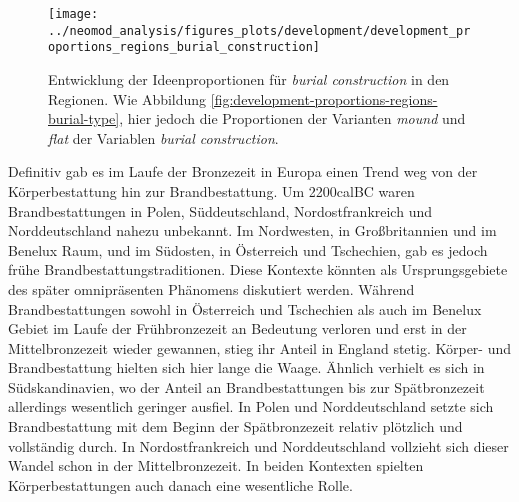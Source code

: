 \documentclass[openany,twoside,twocolumn]{book}
\begin{document}
\begin{figure}[!t]

{\centering \texttt{[image: ../neomod\_analysis/figures\_plots/development/development\_proportions\_regions\_burial\_construction]} 

}

\caption[Entwicklung der Ideenproportionen für \textit{burial construction} in den Regionen]{Entwicklung der Ideenproportionen für \textit{burial construction} in den Regionen. Wie Abbildung \ref{fig:development-proportions-regions-burial-type}, hier jedoch die Proportionen der Varianten \textit{mound} und \textit{flat} der Variablen \textit{burial construction}.}\label{fig:development-proportions-regions-burial-construction}
\end{figure}

Definitiv gab es im Laufe der Bronzezeit in Europa einen Trend weg von
der Körperbestattung hin zur Brandbestattung. Um 2200calBC waren
Brandbestattungen in Polen, Süddeutschland, Nordostfrankreich und
Norddeutschland nahezu unbekannt. Im Nordwesten, in Großbritannien und
im Benelux Raum, und im Südosten, in Österreich und Tschechien, gab es
jedoch frühe Brandbestattungstraditionen. Diese Kontexte könnten als
Ursprungsgebiete des später omnipräsenten Phänomens diskutiert werden.
Während Brandbestattungen sowohl in Österreich und Tschechien als auch
im Benelux Gebiet im Laufe der Frühbronzezeit an Bedeutung verloren und
erst in der Mittelbronzezeit wieder gewannen, stieg ihr Anteil in
England stetig. Körper- und Brandbestattung hielten sich hier lange die
Waage. Ähnlich verhielt es sich in Südskandinavien, wo der Anteil an
Brandbestattungen bis zur Spätbronzezeit allerdings wesentlich geringer
ausfiel. In Polen und Norddeutschland setzte sich Brandbestattung mit
dem Beginn der Spätbronzezeit relativ plötzlich und vollständig durch.
In Nordostfrankreich und Norddeutschland vollzieht sich dieser Wandel
schon in der Mittelbronzezeit. In beiden Kontexten spielten
Körperbestattungen auch danach eine wesentliche Rolle.
\end{document}
